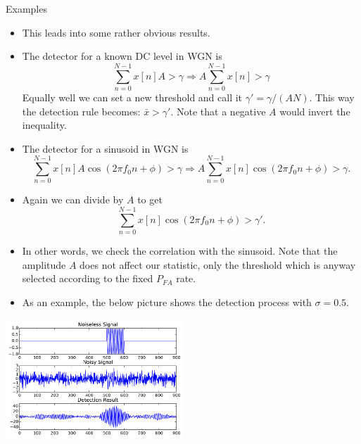 \documentclass[10pt, aspectratio=169]{beamer} %
\begin{document}
\begin{frame}[allowframebreaks=0.8]
 {Examples}
\begin{itemize}
\item This leads into some rather obvious results.
\item The detector for a known DC level in WGN is
\[
 \sum_{n=0}^{N-1}x[n] A  > \gamma \Rightarrow A \sum_{n=0}^{N-1}x[n] > \gamma
\]
Equally well we can set a new threshold and call it $\gamma' = \gamma / (AN)$.
This way the detection rule becomes: $\bar{x} > \gamma'$. Note that a negative $A$
would invert the inequality.
\item The detector for a sinusoid in WGN is
{\small
\[
 \sum_{n=0}^{N-1}x[n] A\cos(2\pi f_0 n + \phi)  > \gamma \Rightarrow A \sum_{n=0}^{N-1}x[n] \cos(2\pi f_0 n + \phi) > \gamma.
\]}
\item Again we can divide by $A$ to get 
{\small
\[
\sum_{n=0}^{N-1}x[n] \cos(2\pi f_0 n + \phi) > \gamma'.
\]
}
\item In other words, we check the correlation with the sinusoid. Note that the
amplitude $A$ does not affect our statistic, only the threshold which is
anyway selected according to the fixed $P_{FA}$ rate.
\framebreak
\item As an example, the below picture shows the detection process with $\sigma = 0.5$.


\end{itemize}
\centerline{\includegraphics[width=0.5\textwidth]{sinusoidDetection.pdf}}

\end{frame}
\end{document}
